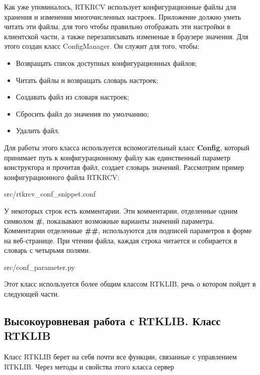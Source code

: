 Как уже упоминалось, RTKRCV использует конфигурационные файлы для хранения и изменения многочисленных настроек. Приложение должно уметь читать эти файлы, для того чтобы правильно отображать эти настройки в клиентской части, а также перезаписывать измененые в браузере значения. Для этого создан класс ConfigManager. Он служит для того, чтобы:

\begin{itemize}
  \item Возвращать список доступных конфигурационных файлов;
  \item Читать файлы и возвращать словарь настроек;
  \item Создавать файл из словаря настроек;
  \item Сбросить файл до значения по умолчанию;
  \item Удалить файл.
\end{itemize}

Для работы этого класса используется вспомогательный класс \textbf{Config}, который принимает путь к конфигурационному файлу как единственный параметр конструктора и прочитав файл, создает словарь значений. Рассмотрим пример конфигурационного файла RTKRCV:


{src/rtkrcv_conf_snippet.conf}

У некоторых строк есть комментарии. Эти комментарии, отделенные одним символом \textbf{\#}, показывают возможные варианты значений параметра. Комментарии отделенные \textbf{\#\#}, используются для подписей параметров в форме на веб-странице. При чтении файла, каждая строка читается и собирается в словарь с четырьмя полями.


{src/conf_parameter.py}

Этот класс используется более общим классом RTKLIB, речь о котором пойдет в следующей части.

\subsection{Высокоуровневая работа с RTKLIB. Класс RTKLIB} \label{subsect3_1_4}

Класс RTKLIB берет на себя почти все функции, связанные с управлением RTKLIB. Через методы и свойства этого класса сервер


